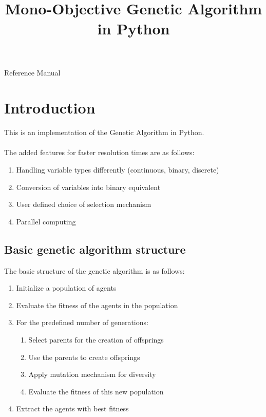 \documentclass[a4paper]{article}
\begin{document}
\title{Mono-Objective Genetic Algorithm in Python}
\author {}
\maketitle

\centerline{Reference Manual} 
\newpage

\tableofcontents

\clearpage

\section{Introduction}

This is an implementation of the Genetic Algorithm in Python. 
\\
\\The added features for faster resolution times are as follows:

\begin{enumerate}
\item Handling variable types differently (continuous, binary, discrete)
\item Conversion of variables into binary equivalent 
\item User defined choice of selection mechanism 
\item Parallel computing 
\end{enumerate}

\subsection{Basic genetic algorithm structure}

The basic structure of the genetic algorithm is as follows:

\begin{enumerate}
\item Initialize a population of agents
\item Evaluate the fitness of the agents in the population 
\item For the predefined number of generations: 
\begin{enumerate}
\item Select parents for the creation of offsprings
\item Use the parents to create offsprings 
\item Apply mutation mechanism for diversity 
\item Evaluate the fitness of this new population 
\end{enumerate}
\item Extract the agents with best fitness 
\end{enumerate}
\end{document}
